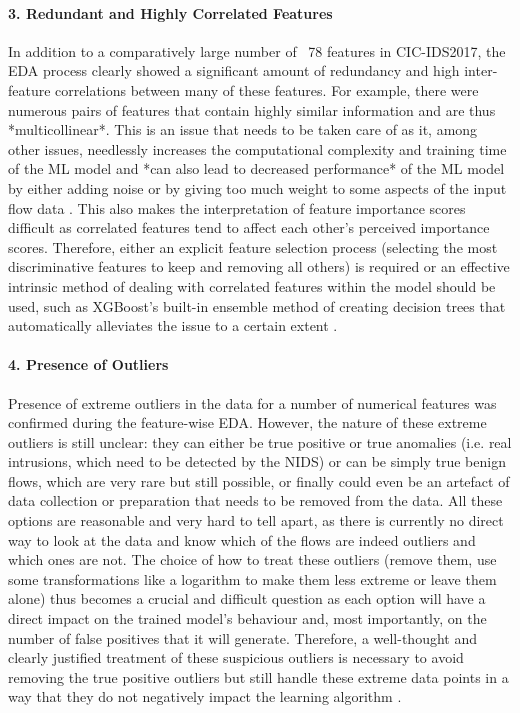 \paragraph{3. Redundant and Highly Correlated Features} 
In addition to a comparatively large number of ~78 features in CIC-IDS2017, the EDA process clearly showed a significant amount of redundancy and high inter-feature correlations between many of these features. For example, there were numerous pairs of features that contain highly similar information and are thus *multicollinear*. This is an issue that needs to be taken care of as it, among other issues, needlessly increases the computational complexity and training time of the ML model and *can also lead to decreased performance* of the ML model by either adding noise or by giving too much weight to some aspects of the input flow data \parencite{kumar2021cicids}. This also makes the interpretation of feature importance scores difficult as correlated features tend to affect each other's perceived importance scores. Therefore, either an explicit feature selection process (selecting the most discriminative features to keep and removing all others) is required or an effective intrinsic method of dealing with correlated features within the model should be used, such as XGBoost's built-in ensemble method of creating decision trees that automatically alleviates the issue to a certain extent \parencite{guha2017tutorial}.

\paragraph{4. Presence of Outliers} 
Presence of extreme outliers in the data for a number of numerical features was confirmed during the feature-wise EDA. However, the nature of these extreme outliers is still unclear: they can either be true positive or true anomalies (i.e. real intrusions, which need to be detected by the NIDS) or can be simply true benign flows, which are very rare but still possible, or finally could even be an artefact of data collection or preparation that needs to be removed from the data. All these options are reasonable and very hard to tell apart, as there is currently no direct way to look at the data and know which of the flows are indeed outliers and which ones are not. The choice of how to treat these outliers (remove them, use some transformations like a logarithm to make them less extreme or leave them alone) thus becomes a crucial and difficult question as each option will have a direct impact on the trained model's behaviour and, most importantly, on the number of false positives that it will generate. Therefore, a well-thought and clearly justified treatment of these suspicious outliers is necessary to avoid removing the true positive outliers but still handle these extreme data points in a way that they do not negatively impact the learning algorithm \parencite{al2022cicids}.

